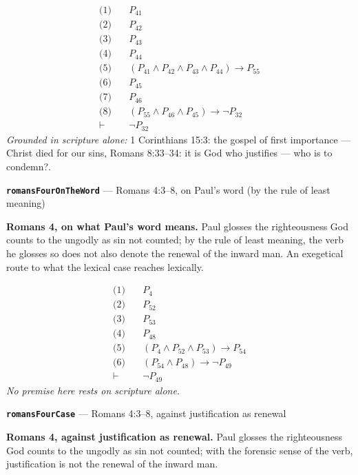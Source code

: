 \documentclass[11pt]{article}
\begin{document}
\begin{align*}
  \text{(1)} \quad & P_{41} \\
  \text{(2)} \quad & P_{42} \\
  \text{(3)} \quad & P_{43} \\
  \text{(4)} \quad & P_{44} \\
  \text{(5)} \quad & (P_{41} \land P_{42} \land P_{43} \land P_{44}) \rightarrow P_{55} \\
  \text{(6)} \quad & P_{45} \\
  \text{(7)} \quad & P_{46} \\
  \text{(8)} \quad & (P_{55} \land P_{46} \land P_{45}) \rightarrow \lnot P_{32} \\
  \vdash \quad & \lnot P_{32}
\end{align*}
\emph{Grounded in scripture alone:} 1 Corinthians 15:3: the gospel of first importance — Christ died for our sins, Romans 8:33–34: it is God who justifies — who is to condemn?.
\par\medskip\noindent\textbf{\texttt{romans\allowbreak{}Four\allowbreak{}On\allowbreak{}The\allowbreak{}Word}} --- Romans 4:3–8, on Paul's word (by the rule of least meaning)\par\nobreak\noindent
\textbf{Romans 4, on what Paul's word means.} Paul glosses the righteousness God counts to the ungodly as sin not counted; by the rule of least meaning, the verb he glosses so does not also denote the renewal of the inward man. An exegetical route to what the lexical case reaches lexically.

\begin{align*}
  \text{(1)} \quad & P_{4} \\
  \text{(2)} \quad & P_{52} \\
  \text{(3)} \quad & P_{53} \\
  \text{(4)} \quad & P_{48} \\
  \text{(5)} \quad & (P_{4} \land P_{52} \land P_{53}) \rightarrow P_{54} \\
  \text{(6)} \quad & (P_{54} \land P_{48}) \rightarrow \lnot P_{49} \\
  \vdash \quad & \lnot P_{49}
\end{align*}
\emph{No premise here rests on scripture alone.}
\par\medskip\noindent\textbf{\texttt{romans\allowbreak{}Four\allowbreak{}Case}} --- Romans 4:3–8, against justification as renewal\par\nobreak\noindent
\textbf{Romans 4, against justification as renewal.} Paul glosses the righteousness God counts to the ungodly as sin not counted; with the forensic sense of the verb, justification is not the renewal of the inward man.
\end{document}
